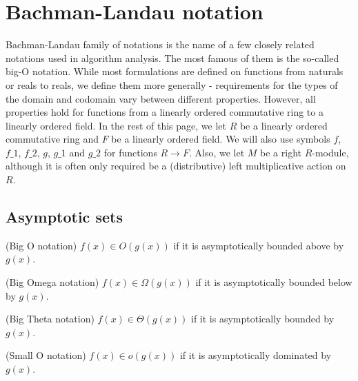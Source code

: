 \section{Bachman-Landau notation}

Bachman-Landau family of notations is the name of a few closely related notations used in 
algorithm analysis. The most famous of them is the so-called big-O notation. While
most formulations are defined on functions from naturals or reals to reals, we define 
them more generally - requirements for the types of the domain and codomain vary between 
different properties. However, all properties hold for functions from a linearly ordered 
commutative ring to a linearly ordered field. In the rest of this page, we let $R$ be a linearly 
ordered commutative ring and $F$ be a linearly ordered field. We will also use symbols $f$, 
$f\_1$, $f\_2$, $g$, $g\_1$ and $g\_2$ for functions $R \to F$. Also, we let $M$ be 
a right $R$-module, although it is often only required be a (distributive) left multiplicative 
action on $R$.


\subsection{Asymptotic sets}

\begin{definition}(Big O notation)
    \label{def:big_o}
    \leanok
    $f(x) \in O(g(x))$ if it is asymptotically bounded above by $g(x)$.
\end{definition}

\begin{definition}(Big Omega notation)
    \label{def:big_omega}
    \leanok
    $f(x) \in \Omega(g(x))$ if it is asymptotically bounded below by $g(x)$.
\end{definition}

\begin{definition}(Big Theta notation)
    \label{def:big_theta}
    \leanok
    $f(x) \in \Theta(g(x))$ if it is asymptotically bounded by $g(x)$. 
\end{definition}

\begin{definition}(Small O notation)
    \label{def:small_o}
    \leanok
    $f(x) \in o(g(x))$ if it is asymptotically dominated by $g(x)$.
\end{definition}

